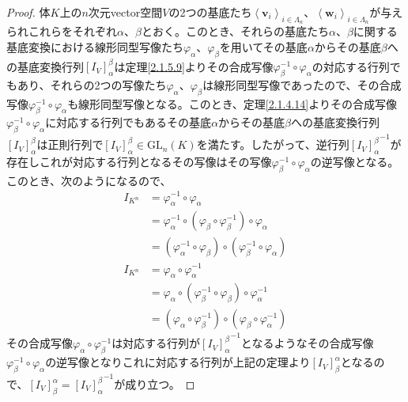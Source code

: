 \documentclass[dvipdfmx]{jsarticle}
\begin{document}
\begin{proof}
体$K$上の$n$次元vector空間$V$の2つの基底たち$\left\langle \mathbf{v}_{i} \right\rangle_{i \in \varLambda_{n}}$、$\left\langle \mathbf{w}_{i} \right\rangle_{i \in \varLambda_{n}}$が与えられこれらをそれぞれ$\alpha$、$\beta$とおく。このとき、それらの基底たち$\alpha$、$\beta$に関する基底変換における線形同型写像たち$\varphi_{\alpha}$、$\varphi_{\beta}$を用いてその基底$\alpha$からその基底$\beta$への基底変換行列$\left[ I_{V} \right]^{\beta}_{\alpha}$は定理\ref{2.1.5.9}よりその合成写像$\varphi_{\beta}^{- 1} \circ \varphi_{\alpha}$の対応する行列でもあり、それらの2つの写像たち$\varphi_{\alpha}$、$\varphi_{\beta}$は線形同型写像であったので、その合成写像$\varphi_{\beta}^{- 1} \circ \varphi_{\alpha}$も線形同型写像となる。このとき、定理\ref{2.1.4.14}よりその合成写像$\varphi_{\beta}^{- 1} \circ \varphi_{\alpha}$に対応する行列でもあるその基底$\alpha$からその基底$\beta$への基底変換行列$\left[ I_{V} \right]^{\beta}_{\alpha}$は正則行列で$\left[ I_{V} \right]^{\beta}_{\alpha} \in {\mathrm{GL}}_{n}(K)$を満たす。したがって、逆行列${\left[ I_{V} \right]^{\beta}_{\alpha}}^{- 1}$が存在しこれが対応する行列となるその写像はその写像$\varphi_{\beta}^{- 1} \circ \varphi_{\alpha}$の逆写像となる。このとき、次のようになるので、
\begin{align*}
I_{K^{n}} &= \varphi_{\alpha}^{- 1} \circ \varphi_{\alpha}\\
&= \varphi_{\alpha}^{- 1} \circ \left( \varphi_{\beta} \circ \varphi_{\beta}^{- 1} \right) \circ \varphi_{\alpha}\\
&= \left( \varphi_{\alpha}^{- 1} \circ \varphi_{\beta} \right) \circ \left( \varphi_{\beta}^{- 1} \circ \varphi_{\alpha} \right)\\
I_{K^{n}} &= \varphi_{\alpha} \circ \varphi_{\alpha}^{- 1}\\
&= \varphi_{\alpha} \circ \left( \varphi_{\beta}^{- 1} \circ \varphi_{\beta} \right) \circ \varphi_{\alpha}^{- 1}\\
&= \left( \varphi_{\alpha} \circ \varphi_{\beta}^{- 1} \right) \circ \left( \varphi_{\beta} \circ \varphi_{\alpha}^{- 1} \right)
\end{align*}
その合成写像$\varphi_{\alpha} \circ \varphi_{\beta}^{- 1}$は対応する行列が${\left[ I_{V} \right]^{\beta}_{\alpha}}^{- 1}$となるようなその合成写像$\varphi_{\beta}^{- 1} \circ \varphi_{\alpha}$の逆写像となりこれに対応する行列が上記の定理より$\left[ I_{V} \right]^{\alpha}_{\beta}$となるので、$\left[ I_{V} \right]^{\alpha}_{\beta} = {\left[ I_{V} \right]^{\beta}_{\alpha}}^{- 1}$が成り立つ。
\end{proof}\par
\end{document}

